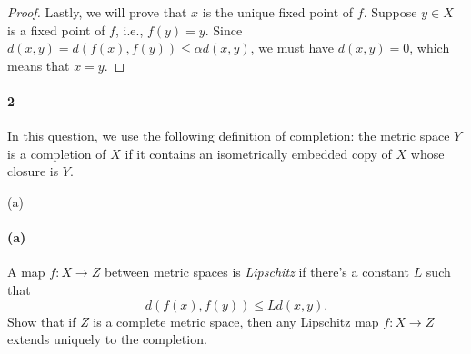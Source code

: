 \documentclass[12pt]{article}
\newlength{\myparskip}
\newenvironment{fullbox}{\begin{lrbox}{\savefullbox}\begin{minipage}{\dimexpr\textwidth-2\fboxsep\relax}\setlength{\parskip}{\myparskip}}{\end{minipage}\end{lrbox}\framebox[\textwidth]{\usebox{\savefullbox}}}
\newenvironment{pbox}[1][]{\begin{fullbox}\ifx#1\empty\else\paragraph{#1}\fi}{\end{fullbox}}
\newcommand{\<}{\langle}
\renewcommand{\>}{\rangle}
\begin{document}
\begin{proof}
    Lastly, we will prove that $x$ is the unique fixed point of $f$. Suppose $y \in X$ is a fixed point of $f$, i.e., $f(y) = y$. Since $d(x, y) = d(f(x), f(y)) \leq \alpha d(x, y)$, we must have $d(x, y) = 0$, which means that $x = y$.

\end{proof}




\newpage
\begin{pbox}[2]
    In this question, we use the following definition of completion: the
  metric space $Y$ is a completion of $X$ if it contains an isometrically
  embedded copy of $X$ whose closure is $Y$.
\end{pbox}

\begin{pbox}[(a)]
    A map $f:X \to Z$ between metric spaces is \emph{Lipschitz} if there's a constant $L$ such that
    \[d(f(x),f(y)) \leq Ld(x,y).\]
    Show that if $Z$ is a complete metric space, then any Lipschitz map
    $f:X \to Z$ extends uniquely to the completion.
\end{pbox}
\end{document}
